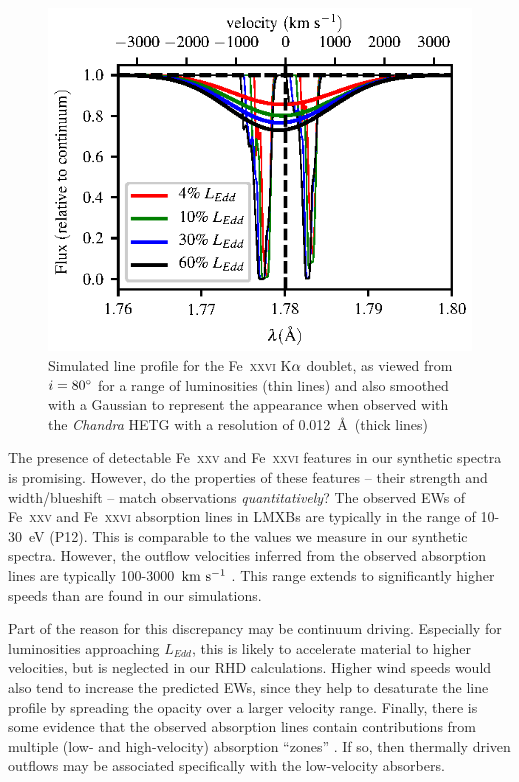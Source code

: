\documentclass[a4paper,fleqn,usenatbib]{mnras}
\begin{document}
\begin{figure}
\includegraphics[width=\columnwidth]{figures/fig6_80_degrees_fe26_smooth.eps}
\caption{Simulated line profile for the Fe~\textsc{xxvi} K$\rm{\alpha}$
doublet, as viewed from $i = 80\degree$ for a range
of luminosities (thin lines) and also smoothed with a Gaussian to represent the appearance when
observed with the \emph{Chandra} HETG with a resolution of 0.012~\AA~(thick lines)}
\label{figure:line26_smooth}
\end{figure}

The presence of detectable Fe~\textsc{xxv} and Fe~\textsc{xxvi}
features in our synthetic spectra is promising. However, do the
properties of these features -- their strength and width/blueshift --
match observations {\em quantitatively}? The observed EWs of
Fe~\textsc{xxv} and Fe~\textsc{xxvi} absorption lines in LMXBs are
typically in the range of 10-30~eV (P12). This is
comparable to the values we measure in our synthetic spectra. However,
 the outflow velocities inferred from
the observed absorption lines are typically 100-3000~$\rm{km~s^{-1}}$
\cite{2016AN....337..368D,2016AN....337..512P}. This range extends to
significantly higher speeds than are found in our simulations.

Part of the reason for this
discrepancy may be continuum driving. Especially for luminosities
approaching ${L_{Edd}}$, this is likely to accelerate material to
higher velocities, but is neglected in our RHD calculations. Higher
wind speeds would also tend to increase the predicted EWs, since they
help to desaturate the line profile by spreading the opacity over a larger
velocity range. Finally, there is some evidence that the observed
absorption lines contain contributions from multiple (low- and
high-velocity) absorption ``zones'' \cite{2015ApJ...814...87M}. If so,
then thermally driven outflows may be associated specifically with 
the low-velocity absorbers.
\end{document}

